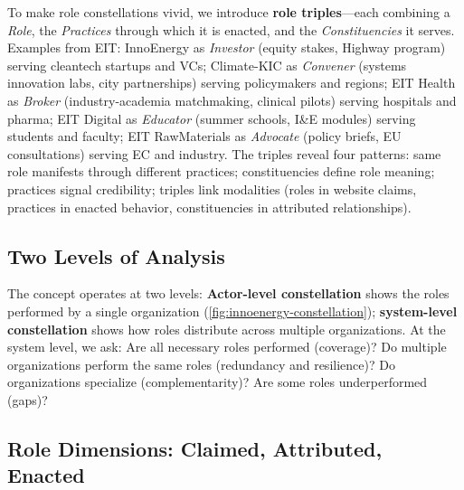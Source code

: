 \documentclass[../main.tex]{subfiles}
\begin{document}
To make role constellations vivid, we introduce \textbf{role triples}---each combining a \textit{Role}, the \textit{Practices} through which it is enacted, and the \textit{Constituencies} it serves. Examples from EIT: InnoEnergy as \textit{Investor} (equity stakes, Highway program) serving cleantech startups and VCs; Climate-KIC as \textit{Convener} (systems innovation labs, city partnerships) serving policymakers and regions; EIT Health as \textit{Broker} (industry-academia matchmaking, clinical pilots) serving hospitals and pharma; EIT Digital as \textit{Educator} (summer schools, I\&E modules) serving students and faculty; EIT RawMaterials as \textit{Advocate} (policy briefs, EU consultations) serving EC and industry. The triples reveal four patterns: same role manifests through different practices; constituencies define role meaning; practices signal credibility; triples link modalities (roles in website claims, practices in enacted behavior, constituencies in attributed relationships).

\subsection{Two Levels of Analysis}

The concept operates at two levels: \textbf{Actor-level constellation} shows the roles performed by a single organization (\cref{fig:innoenergy-constellation}); \textbf{system-level constellation} shows how roles distribute across multiple organizations. At the system level, we ask: Are all necessary roles performed (coverage)? Do multiple organizations perform the same roles (redundancy and resilience)? Do organizations specialize (complementarity)? Are some roles underperformed (gaps)?

\subsection{Role Dimensions: Claimed, Attributed, Enacted}
\end{document}

